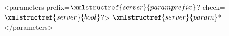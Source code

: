 <parameters prefix=$\xmlstructref{server}{paramprefix}$? check=$\xmlstructref{server}{bool}$?>
 $\xmlstructref{server}{param}$*
</parameters>
